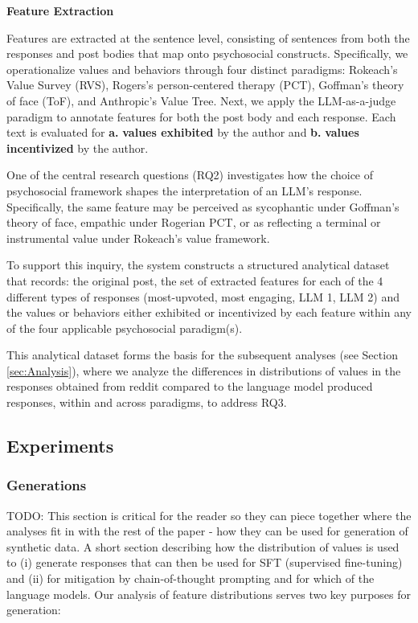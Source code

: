 \bigskip 
\textbf{Feature Extraction}

\medskip Features are extracted at the sentence level, consisting of sentences from both the responses and post bodies that map onto psychosocial constructs. Specifically, we operationalize values and behaviors through four distinct paradigms: Rokeach’s Value Survey (RVS), Rogers’s person-centered therapy (PCT), Goffman’s theory of face (ToF), and Anthropic’s Value Tree.
Next, we apply the LLM-as-a-judge paradigm \cite{zheng-et-al} to annotate features for both the post body and each response. Each text is evaluated for \textbf{a.} \textbf{values exhibited} by the author and \textbf{b.} \textbf{values incentivized} by the author. 

\medskip One of the central research questions (RQ2) investigates how the choice of psychosocial framework shapes the interpretation of an LLM’s response. Specifically, the same feature may be perceived as sycophantic under Goffman’s theory of face, empathic under Rogerian PCT, or as reflecting a terminal or instrumental value under Rokeach’s value framework.

To support this inquiry, the system constructs a structured analytical dataset that records: the original post, the set of extracted features for each of the 4 different types of responses (most-upvoted, most engaging, LLM 1, LLM 2) and the values or behaviors either exhibited or incentivized by each feature within any of the four applicable psychosocial paradigm(s).

This analytical dataset forms the basis for the subsequent analyses (see Section \ref{sec:Analysis}), where we analyze the differences in distributions of values in the responses obtained from reddit compared to the language model produced responses, within and across paradigms, to address RQ3.

\subsection{Experiments}
\textcolor{black!30}{\lipsum[14-16]}


\subsubsection{Generations}
\textcolor{black!40}{TODO: This section is critical for the reader so they can piece together where the analyses fit in with the rest of the paper - how they can be used for generation of synthetic data. A short section describing how the distribution of values is used to (i) generate responses that can then be used for SFT (supervised fine-tuning) and (ii) for mitigation by chain-of-thought prompting and for which of the language models.}
Our analysis of feature distributions serves two key purposes for generation:


